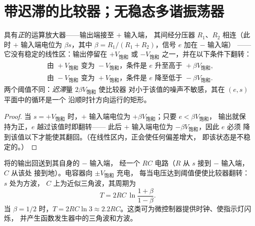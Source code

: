 \section{带迟滞的比较器；无稳态多谐振荡器}

\begin{proposition}[迟滞比较器]\label{prop:b2:feedback-oscillators:schmitt}
具有\emph{正}的运算放大器——输出端接至 $+$ 输入端，
其间经分压器 $R_1$、$R_2$ 相连（此时 $+$ 输入端电位为 $\beta s$，其中
$\beta = R_1/(R_1 + R_2)$，信号 $e$ 加在 $-$ 输入端）
——它没有稳定的线性区：输出停留在 $+V_{\text{饱和}}$ 或
$-V_{\text{饱和}}$ 之一，并在以下条件下翻转：
\begin{align*}
&\text{由 } +V_{\text{饱和}} \text{ 变为 } -V_{\text{饱和}} \text{，条件是 } e \text{ 升至高于 } +\beta V_{\text{饱和}} ,\\
&\text{由 } -V_{\text{饱和}} \text{ 变为 } +V_{\text{饱和}} \text{，条件是 } e \text{ 降至低于 } -\beta V_{\text{饱和}} .
\end{align*}
两个阈值不同：\emph{迟滞}量 $2\beta V_{\text{饱和}}$ 使比较器
对小于该值的噪声不敏感，其在 $(e, s)$ 平面中的循环是一个
沿顺时针方向运行的矩形。
\end{proposition}

\begin{proof}
当 $s = +V_{\text{饱和}}$ 时，$+$ 输入端电位为 $+\beta V_{\text{饱和}}$；只要 $e < \beta V_{\text{饱和}}$，
输出就保持为正，$e$ 越过该值时即翻转——
此后 $+$ 输入端电位为 $-\beta V_{\text{饱和}}$，因此 $e$ 必须
降到该值以下才能使其翻回。（在线性区内，正会使任何偏差增大，
即该状态是不稳定的。）
\end{proof}

\begin{proposition}[无稳态多谐振荡器]\label{prop:b2:feedback-oscillators:astable}
将的输出回送到其自身的 $-$ 输入端，
经一个 $RC$ 电路（$R$ 从 $s$ 接到 $-$ 输入端，$C$ 从该处
接到地）。电容器向 $\pm V_{\text{饱和}}$ 充电，
每当电压达到阈值便使比较器翻转：$s$ 处为方波，
$C$ 上为近似三角波，其周期为
\[
T = 2RC\,\ln\frac{1 + \beta}{1 - \beta} .
\]
当 $\beta = 1/2$ 时，$T = 2RC\ln3 \approx 2.2RC$。这类\emph{}可为微控制器提供时钟、使指示灯闪烁，
并产生函数发生器中的三角波和方波。
\end{proposition}

